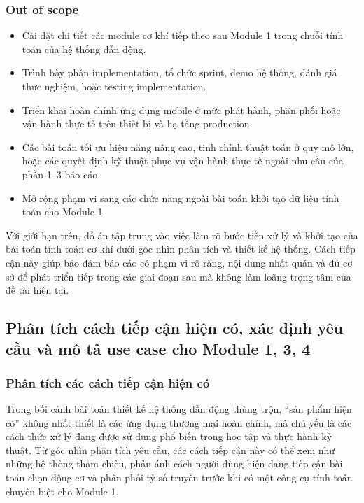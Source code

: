 \documentclass[a4paper]{article}
\begin{document}
\subsubsection*{\uline{Out of scope}}

\begin{itemize}
\item Cài đặt chi tiết các module cơ khí tiếp theo sau Module 1 trong chuỗi tính toán của hệ thống dẫn động.
\item Trình bày phần implementation, tổ chức sprint, demo hệ thống, đánh giá thực nghiệm, hoặc testing implementation.
\item Triển khai hoàn chỉnh ứng dụng mobile ở mức phát hành, phân phối hoặc vận hành thực tế trên thiết bị và hạ tầng production.
\item Các bài toán tối ưu hiệu năng nâng cao, tinh chỉnh thuật toán ở quy mô lớn, hoặc các quyết định kỹ thuật phục vụ vận hành thực tế ngoài nhu cầu của phần 1--3 báo cáo.
\item Mở rộng phạm vi sang các chức năng ngoài bài toán khởi tạo dữ liệu tính toán cho Module 1.
\end{itemize}

Với giới hạn trên, đồ án tập trung vào việc làm rõ bước tiền xử lý và khởi tạo của bài toán tính toán cơ khí dưới góc nhìn phân tích và thiết kế hệ thống. Cách tiếp cận này giúp bảo đảm báo cáo có phạm vi rõ ràng, nội dung nhất quán và đủ cơ sở để phát triển tiếp trong các giai đoạn sau mà không làm loãng trọng tâm của đề tài hiện tại.

\newpage

\subsection{Phân tích cách tiếp cận hiện có, xác định yêu cầu và mô tả use case cho Module 1, 3, 4}
\subsubsection{Phân tích các cách tiếp cận hiện có}
Trong bối cảnh bài toán thiết kế hệ thống dẫn động thùng trộn, ``sản phẩm hiện có'' không nhất thiết là các ứng dụng thương mại hoàn chỉnh, mà chủ yếu là các cách thức xử lý đang được sử dụng phổ biến trong học tập và thực hành kỹ thuật. Từ góc nhìn phân tích yêu cầu, các cách tiếp cận này có thể xem như những hệ thống tham chiếu, phản ánh cách người dùng hiện đang tiếp cận bài toán chọn động cơ và phân phối tỷ số truyền trước khi có một công cụ tính toán chuyên biệt cho Module 1.
\end{document}
